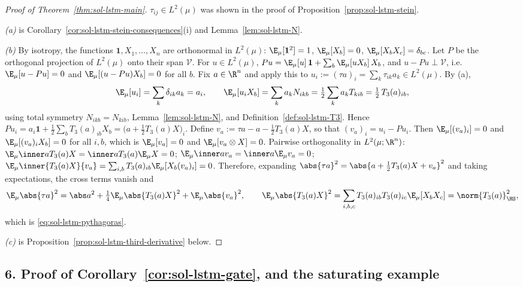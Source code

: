 \documentclass[../main.tex]{subfiles}
\begin{document}
\begin{proof}[Proof of Theorem~\ref{thm:sol-lstm-main}]
$\tau_{ij}\in L^2(\mu)$ was shown in the proof of Proposition~\ref{prop:sol-lstm-stein}.

\emph{(a)} is Corollary~\ref{cor:sol-lstm-stein-consequences}(i) and Lemma~\ref{lem:sol-lstm-N}.

\emph{(b)} By isotropy, the functions $\mathbf 1,X_1,\dots,X_n$ are orthonormal in $L^2(\mu)$:
$\E_\mu[\mathbf 1^2]=1$, $\E_\mu[X_b]=0$, $\E_\mu[X_bX_c]=\delta_{bc}$.  Let $P$ be the
orthogonal projection of $L^2(\mu)$ onto their span $\mathcal V$.  For $u\in L^2(\mu)$,
$Pu=\E_\mu[u]\,\mathbf 1+\sum_b\E_\mu[uX_b]\,X_b$, and $u-Pu\perp\mathcal V$, i.e.\
$\E_\mu[u-Pu]=0$ and $\E_\mu[(u-Pu)X_b]=0$ for all $b$.  Fix $a\in\R^n$ and apply this to
$u_i:=(\tau a)_i=\sum_k\tau_{ik}a_k\in L^2(\mu)$.  By (a),
\[
  \E_\mu[u_i]=\sum_k\delta_{ik}a_k=a_i,
  \qquad
  \E_\mu[u_iX_b]=\sum_ka_kN_{ikb}=\tfrac12\sum_ka_kT_{kib}=\tfrac12\,T_3(a)_{ib},
\]
using total symmetry $N_{ikb}=N_{kib}$, Lemma~\ref{lem:sol-lstm-N}, and
Definition~\ref{def:sol-lstm-T3}.  Hence $Pu_i=a_i\mathbf 1+\tfrac12\sum_bT_3(a)_{ib}X_b=\bigl(a+\tfrac12T_3(a)X\bigr)_i$.
Define $v_a:=\tau a-a-\tfrac12T_3(a)X$, so that $(v_a)_i=u_i-Pu_i$.  Then $\E_\mu[(v_a)_i]=0$
and $\E_\mu[(v_a)_iX_b]=0$ for all $i,b$, which is $\E_\mu[v_a]=0$ and $\E_\mu[v_a\otimes X]=0$.
Pairwise orthogonality in $L^2(\mu;\R^n)$:
$\E_\mu\inner a{T_3(a)X}=\inner a{T_3(a)\E_\mu X}=0$;
$\E_\mu\inner a{v_a}=\inner a{\E_\mu v_a}=0$;
$\E_\mu\inner{T_3(a)X}{v_a}=\sum_{i,b}T_3(a)_{ib}\E_\mu[X_b(v_a)_i]=0$.
Therefore, expanding $\abs{\tau a}^2=\abs{a+\tfrac12T_3(a)X+v_a}^2$ and taking expectations,
the cross terms vanish and
\[
  \E_\mu\abs{\tau a}^2=\abs a^2+\tfrac14\E_\mu\abs{T_3(a)X}^2+\E_\mu\abs{v_a}^2,
  \qquad
  \E_\mu\abs{T_3(a)X}^2=\sum_{i,b,c}T_3(a)_{ib}T_3(a)_{ic}\E_\mu[X_bX_c]=\norm{T_3(a)}_{\HS}^2,
\]
which is \eqref{eq:sol-lstm-pythagoras}.

\emph{(c)} is Proposition~\ref{prop:sol-lstm-third-derivative} below.
\end{proof}

\subsection*{6. Proof of Corollary~\ref{cor:sol-lstm-gate}, and the saturating example}
\end{document}
